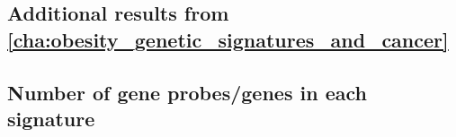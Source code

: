 \begin{appendices}
	\renewcommand{\thesection}{\Alph{section}\arabic{section}}
	\chapter{Additional results from \cref{cha:obesity_genetic_signatures_and_cancer}}
	\label{app:a}
	
	\section{Number of gene probes/genes in each signature}
	\label{app:number_of_gene_probes_genes_in_each_signature}
	
	
\end{appendices}
